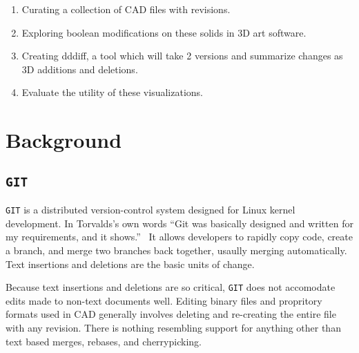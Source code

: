 \documentclass[sigconf,]{acmart}
\begin{document}
\begin{enumerate}
	\item Curating a collection of CAD files with revisions.
	\item Exploring boolean modifications on these solids in 3D art software.
	\item Creating dddiff, a tool which will take 2 versions and summarize changes as 3D additions and deletions.
	\item Evaluate the utility of these visualizations.
\end{enumerate}


\section{Background}

\subsection{\texttt{GIT}}



\texttt{GIT} is a distributed version-control system designed for Linux kernel development.
In Torvalds's own words ``Git was basically designed and written for my requirements, and it shows.''~\cite{https://www.linuxfoundation.org/blog/blog/10-years-of-git-an-interview-with-git-creator-linus-torvalds}
It allows developers to rapidly copy code, create a branch, and merge two branches back together, usaully merging automatically.
Text insertions and deletions are the basic units of change.


Because text insertions and deletions are so critical, \texttt{GIT} does not accomodate edits made to non-text documents well.
Editing binary files and propritory formats used in CAD generally involves deleting and re-creating the entire file with any revision.
There is nothing resembling support for anything other than text based merges, rebases, and cherrypicking.
\end{document}
